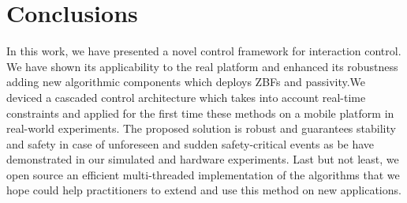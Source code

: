 \section{Conclusions} \label{sec:conclusions}

In this work, we have presented a novel control framework for interaction control. We have shown its applicability to the real platform and enhanced its robustness adding new algorithmic components which deploys ZBFs and passivity.We deviced a cascaded control architecture which takes into account real-time constraints and applied for the first time these methods on a mobile platform in real-world experiments. The proposed solution is robust and guarantees stability and safety in case of unforeseen and sudden safety-critical events as be have demonstrated in our simulated and hardware experiments. Last but not least, we open source an efficient multi-threaded implementation of the algorithms that we hope could help practitioners to extend and use this method on new applications.


